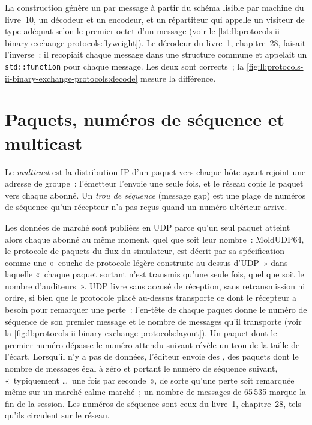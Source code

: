 La construction génère un  par message à partir du schéma lisible par machine du livre~10, un décodeur et un encodeur, et un répartiteur
qui appelle un visiteur de type adéquat selon le premier octet d'un message (voir le \cref{lst:ll:protocols-ii-binary-exchange-protocols:flyweight}).
Le décodeur du livre~1, chapitre~28, faisait l'inverse~: il recopiait chaque message dans une structure commune et appelait un
\texttt{std::function} pour chaque message. Les deux sont corrects~; la \cref{fig:ll:protocols-ii-binary-exchange-protocols:decode} mesure la
différence.

\label{lst:ll:protocols-ii-binary-exchange-protocols:flyweight}

\section{Paquets, numéros de séquence et multicast}

\begin{definition}\label{def:ll:protocols-ii-binary-exchange-protocols:multicast}
Le \emph{multicast} est la distribution IP d'un paquet vers chaque hôte ayant rejoint une adresse de groupe~: l'émetteur
l'envoie une seule fois, et le réseau copie le paquet vers chaque abonné. Un \emph{trou de séquence} (message gap) est une plage
de numéros de séquence qu'un récepteur n'a pas reçus quand un numéro ultérieur arrive.
\end{definition}

Les données de marché sont publiées en  UDP parce qu'un seul paquet atteint alors chaque abonné au même moment, quel que soit leur
nombre~: MoldUDP64, le protocole de paquets du flux du simulateur, est décrit par sa spécification comme une «~couche
de protocole légère construite au-dessus d'UDP~» dans laquelle «~chaque paquet sortant n'est transmis qu'une seule fois, quel que soit le nombre
d'auditeurs~». UDP livre sans accusé de réception, sans retransmission ni ordre, si bien que le protocole placé au-dessus transporte ce dont le
récepteur a besoin pour remarquer une perte~: l'en-tête de chaque paquet donne le numéro de séquence de son premier message et le nombre
de messages qu'il transporte (voir la \cref{fig:ll:protocols-ii-binary-exchange-protocols:layout}). Un paquet dont le premier numéro dépasse le
numéro attendu suivant révèle un trou de la taille de l'écart. Lorsqu'il n'y a pas de données, l'éditeur envoie des , des paquets dont le nombre
de messages égal à zéro et portant le numéro de séquence suivant, «~typiquement \dots\ une fois par seconde~», de sorte qu'une perte soit remarquée même sur un marché calme
marché~; un nombre de messages de 65\,535 marque la fin de la session. Les numéros de séquence sont ceux du livre~1, chapitre~28, tels
qu'ils circulent sur le réseau.

